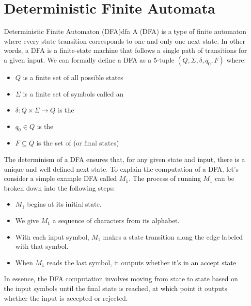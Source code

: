\documentclass[math]{amznotes}
\begin{document}
\section{Deterministic Finite Automata}

\begin{dfnbox}{Deterministic Finite Automaton (DFA)}{dfa}
    A  (DFA) is a type of finite automaton where every state transition corresponds to one and only one next state. In other words, a DFA is a finite-state machine that follows a single path of transitions for a given input.
    \tcblower
    We can formally define a DFA as a 5-tuple $(Q, \Sigma, \delta, q_0, F)$ where:
    \begin{itemize}[noitemsep]
        \item $Q$ is a finite set of all possible states
        \item $\Sigma$ is a finite set of symbols called an 
        \item $\delta : Q \times \Sigma \to Q$ is the 
        \item $q_0 \in Q$ is the 
        \item $F \subseteq Q$ is the set of  (or final states)
    \end{itemize}
\end{dfnbox}

The determinism of a DFA ensures that, for any given state and input, there is a unique and well-defined next state. To explain the computation of a DFA, let's consider a simple example DFA called $M_1$. The process of running $M_1$ can be broken down into the following steps:
\begin{itemize}[noitemsep]
    \item $M_1$ begins at its initial state.
    \item We give $M_1$ a sequence of characters from its alphabet.
    \item With each input symbol, $M_1$ makes a state transition along the edge labeled with that symbol.
    \item When $M_1$ reads the last symbol, it outputs whether it's in an accept state
\end{itemize}

In essence, the DFA computation involves moving from state to state based on the input symbols until the final state is reached, at which point it outputs whether the input is accepted or rejected.
\end{document}
